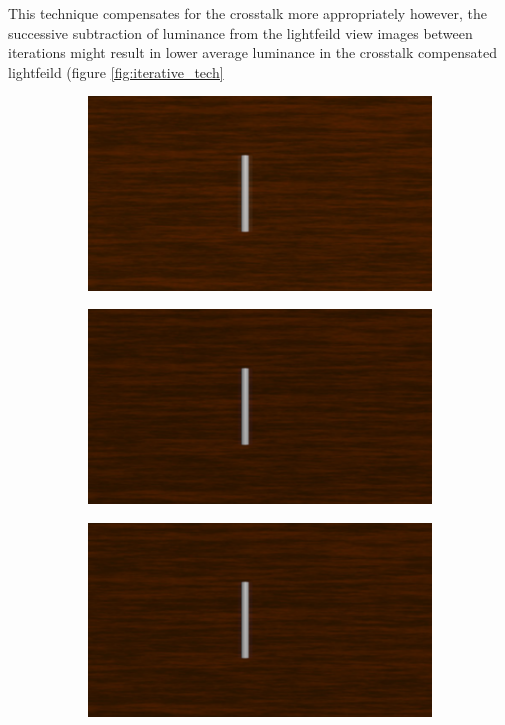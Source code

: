 This technique compensates for the crosstalk more appropriately however, the successive subtraction of luminance from the lightfeild view images between iterations might result in lower average luminance in the crosstalk compensated lightfeild (figure \ref{fig:iterative_tech}
\begin{figure}[htbp]
    \centering
    \begin{subfigure}[b]{0.48\textwidth}
        \includegraphics[width=\textwidth]{./Template_Figures/image_w_ct}
        \caption{}\label{fig:original_lf}
    \end{subfigure}

    \begin{subfigure}[b]{0.48\textwidth}
        \includegraphics[width=\textwidth]{./Template_Figures/subtractive_comp}
        \caption{}\label{fig:subtractive_lf}
    \end{subfigure}
    \begin{subfigure}[b]{0.48\textwidth}
        \includegraphics[width=\textwidth]{./Template_Figures/iterative_comp}
        \caption{}\label{fig:iterative_lf}
    \end{subfigure}


\end{figure}
